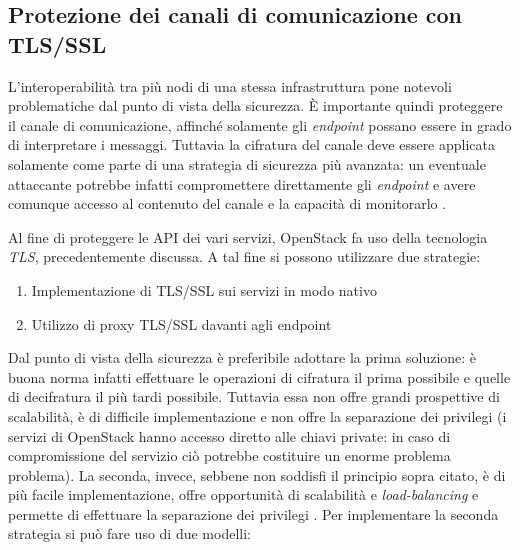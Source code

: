 \documentclass[../main.tex]{subfiles}
\begin{document}
\subsection{Protezione dei canali di comunicazione con TLS/SSL}
L'interoperabilità tra più nodi di una stessa infrastruttura pone notevoli problematiche dal punto di vista della sicurezza.
\`E importante quindi proteggere il canale di comunicazione, affinché solamente gli \textit{endpoint} possano essere in grado di interpretare i messaggi. Tuttavia la cifratura del canale deve essere applicata solamente come parte di una strategia di sicurezza più avanzata: un eventuale attaccante potrebbe infatti compromettere direttamente gli \textit{endpoint} e avere comunque accesso al contenuto del canale e la capacità di monitorarlo \cite{OpenStackSecurity}.

Al fine di proteggere le API dei vari servizi, OpenStack fa uso della tecnologia \textit{TLS}, precedentemente discussa.
A tal fine si possono utilizzare due strategie:
\begin{enumerate}
\item Implementazione di TLS/SSL sui servizi in modo nativo
\item Utilizzo di proxy TLS/SSL davanti agli endpoint
\end{enumerate}
Dal punto di vista della sicurezza è preferibile adottare la prima soluzione: è buona norma infatti effettuare le operazioni di cifratura il prima possibile e quelle di decifratura il più tardi possibile.
Tuttavia essa non offre grandi prospettive di scalabilità, è di difficile implementazione e non offre la separazione dei privilegi (i servizi di OpenStack hanno accesso diretto alle chiavi private: in caso di compromissione del servizio ciò potrebbe costituire un enorme problema problema).
La seconda, invece, sebbene non soddisfi il principio sopra citato, è di più facile implementazione, offre opportunità di scalabilità e \textit{load-balancing} e permette di effettuare  la separazione dei privilegi \cite{OpenStackSecurity}.
Per implementare la seconda strategia si può fare uso di due modelli:
\end{document}
